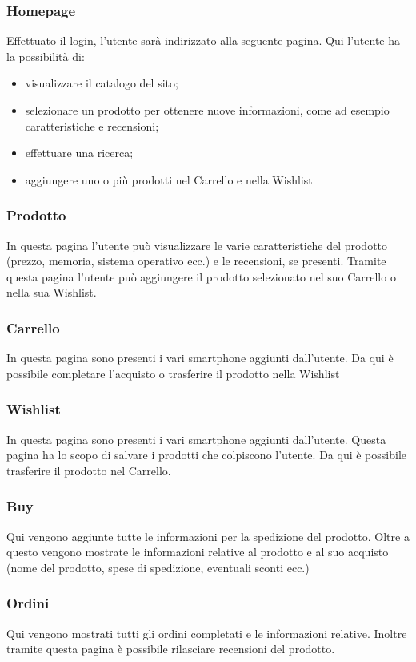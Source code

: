 \documentclass[12pt]{extarticle}
\begin{document}
\subsubsection{Homepage}
Effettuato il login, l'utente sarà indirizzato alla seguente pagina. Qui l'utente ha la
possibilità di:
\begin{itemize}
    \item  visualizzare il catalogo del sito;
    \item selezionare un prodotto per ottenere nuove informazioni, come ad esempio caratteristiche e recensioni;
    \item effettuare una ricerca;
    \item aggiungere uno o più prodotti nel Carrello e nella Wishlist
\end{itemize}

\subsubsection{Prodotto}
In questa pagina l'utente può visualizzare le varie caratteristiche del prodotto (prezzo,
memoria, sistema operativo ecc.) e le recensioni, se presenti. Tramite questa pagina l'utente
può aggiungere il prodotto selezionato nel suo Carrello o nella sua Wishlist.

\subsubsection{Carrello}
In questa pagina sono presenti i vari smartphone aggiunti dall'utente. Da qui è
possibile completare l'acquisto o trasferire il prodotto nella Wishlist

\subsubsection{Wishlist}
In questa pagina sono presenti i vari smartphone aggiunti dall'utente. Questa pagina
ha lo scopo di salvare i prodotti che colpiscono l'utente. Da qui è possibile trasferire il prodotto
nel Carrello.
\subsubsection{Buy}
Qui vengono aggiunte tutte le informazioni per la spedizione del prodotto. Oltre a questo
vengono mostrate le informazioni relative al prodotto e al suo acquisto (nome del prodotto,
spese di spedizione, eventuali sconti ecc.)

\subsubsection{Ordini}
Qui vengono mostrati tutti gli ordini completati e le informazioni relative.
 Inoltre tramite questa pagina è possibile rilasciare recensioni del prodotto.
\end{document}
